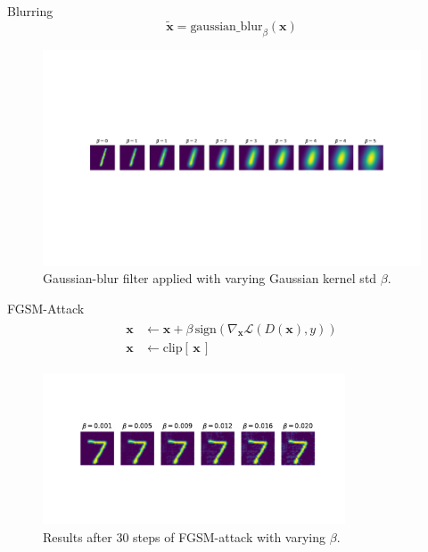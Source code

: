 \documentclass[10pt,usenames,dvipsnames]{beamer}
\renewcommand\vec[1]{\boldsymbol{\mathbf {#1}}}
\newcommand\doubleminipage[2]{
\begin{figure}[H]
\centering
\centerline{
\begin{minipage}{0.5\textwidth}
    \caption*{\footnotesize GTN trained with \texttt{'base\_larger'}}%
    \texttt{[image: figures/base\_larger\_\#1.pdf]}
\end{minipage}%
\begin{minipage}{0.5\textwidth}
    \caption*{\footnotesize GTN trained with \texttt{'base\_larger3'}}%
    \texttt{[image: figures/base\_larger3\_\#1.pdf]}
\end{minipage}
}
\caption{#2%
\label{fig:results_#1}
}
\end{figure}
}
\begin{document}
\begin{frame}{Blurring}
    $$
    \tilde {\vec x} = \text{gaussian\_blur} _\beta (\vec x)
    $$
    
    \begin{figure}[H]
        \centering
        \includegraphics[trim=200 250 100 200, clip, width=\textwidth]{figures/samples_blur.pdf}
        \caption{Gaussian-blur filter applied with varying Gaussian kernel std $\beta$.}
        \label{fig:samples_blur}
    \end{figure}
\end{frame}

\begin{frame}{FGSM-Attack}
    \begin{align*}
    \begin{split}
    \vec x &\gets \vec x + \beta \, \text{sign}\left(\nabla_{\vec x} \mathcal L(D(\vec x), y)\right) \\
    \vec x &\gets \text{clip}[\, \vec x \,]
    \end{split}
    \end{align*}
    
    \begin{figure}[H]
        \centering
        \includegraphics[trim=0 100 0 80, clip, width=0.8\textwidth]{figures/samples_fgsm.pdf}
        \caption{Results after 30 steps of FGSM-attack with varying $\beta$.}
        \label{fig:samples_fgsm}
    \end{figure}
\end{frame}
\end{document}
